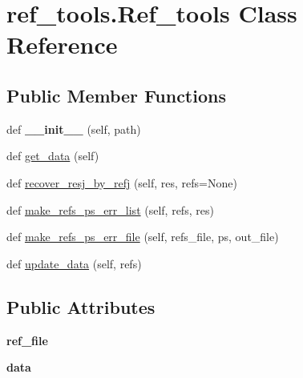 \hypertarget{classref__tools_1_1Ref__tools}{}\section{ref\+\_\+tools.\+Ref\+\_\+tools Class Reference}
\label{classref__tools_1_1Ref__tools}
\subsection*{Public Member Functions}
\begin{DoxyCompactItemize}
\item 
\mbox{\label{classref__tools_1_1Ref__tools_a5458ef0073e9be5479b74fec8c359779}} 
def {\bfseries \+\_\+\+\_\+init\+\_\+\+\_\+} (self, path)
\item 
def \hyperlink{classref__tools_1_1Ref__tools_a86bb2c4bc03443a14406c68caa158e0e}{get\+\_\+data} (self)
\item 
def \hyperlink{classref__tools_1_1Ref__tools_add98e1a86c0220edb3d10ee2b230a95f}{recover\+\_\+resj\+\_\+by\+\_\+refj} (self, res, refs=None)
\item 
def \hyperlink{classref__tools_1_1Ref__tools_a2e7754b9256b80b077036b83664d171d}{make\+\_\+refs\+\_\+ps\+\_\+err\+\_\+list} (self, refs, res)
\item 
def \hyperlink{classref__tools_1_1Ref__tools_a6cf4be10b9bcd448a45f0351ff47fe66}{make\+\_\+refs\+\_\+ps\+\_\+err\+\_\+file} (self, refs\+\_\+file, ps, out\+\_\+file)
\item 
def \hyperlink{classref__tools_1_1Ref__tools_a731f453d656a7b60f0cb0581c2e34614}{update\+\_\+data} (self, refs)
\end{DoxyCompactItemize}
\subsection*{Public Attributes}
\begin{DoxyCompactItemize}
\item 
\mbox{\label{classref__tools_1_1Ref__tools_a7124e2c3d7fcab79736ffe470eb0cbb2}} 
{\bfseries ref\+\_\+file}
\item 
\mbox{\label{classref__tools_1_1Ref__tools_aaed5a0b919a03fcc16baebb17124fc63}} 
{\bfseries data}
\end{DoxyCompactItemize}


